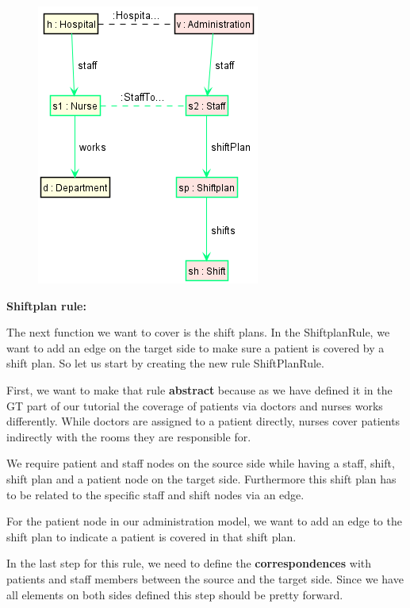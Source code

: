 {\begin{figure}[h]
    \centering
    \includegraphics[scale=0.65 ]{pictures/NurseToStaffRule.png}
    \caption{}
    \label{NurseToStaffRule}
\end{figure}

\textbf{Shiftplan rule:}

The next function we want to cover is the shift plans. In the \textsf{ShiftplanRule}, we want to add an edge on the target side to make sure a patient is covered by a shift plan. So let us start by creating the new rule \textsf{ShiftPlanRule}.\newline

First, we want to make that rule \textbf{abstract} because as we have defined it in the GT part of our tutorial the coverage of patients via doctors and nurses works differently. While doctors are assigned to a patient directly, nurses cover patients indirectly with the rooms they are responsible for.

We require patient and staff nodes on the source side while having a staff, shift, shift plan and a patient node on the target side. Furthermore this shift plan has to be related to the specific staff and shift nodes via an edge.

For the patient node in our administration model, we want to add an edge to the shift plan to indicate a patient is covered in that shift plan.

In the last step for this rule, we need to define the \textbf{correspondences} with patients and staff members between the source and the target side. Since we have all elements on both sides defined this step should be pretty forward.\newline

}
